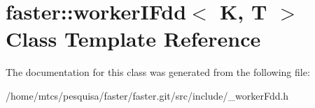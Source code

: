 \hypertarget{classfaster_1_1workerIFdd}{}\section{faster\+:\+:worker\+I\+Fdd$<$ K, T $>$ Class Template Reference}
\label{classfaster_1_1workerIFdd}


The documentation for this class was generated from the following file\+:\begin{DoxyCompactItemize}
\item 
/home/mtcs/pesquisa/faster/faster.\+git/src/include/\+\_\+worker\+Fdd.\+h\end{DoxyCompactItemize}
